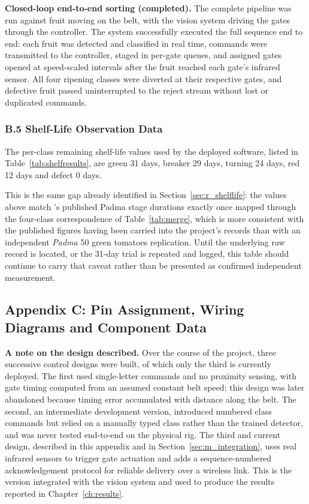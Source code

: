 \textbf{Closed-loop end-to-end sorting (completed).} The complete pipeline was run against fruit moving on the belt, with the vision system driving the gates through the controller. The system successfully executed the full sequence end to end: each fruit was detected and classified in real time, commands were transmitted to the controller, staged in per-gate queues, and assigned gates opened at speed-scaled intervals after the fruit reached each gate's infrared sensor. All four ripening classes were diverted at their respective gates, and defective fruit passed uninterrupted to the reject stream without lost or duplicated commands.

\subsubsection*{B.5 Shelf-Life Observation Data}

The per-class remaining shelf-life values used by the deployed software, listed in Table~\ref{tab:shelfresults}, are green 31 days, breaker 29 days, turning 24 days, red 12 days and defect 0 days.

This is the same gap already identified in Section~\ref{sec:r_shelflife}: the values above match \citet{abekoon2024}'s published Padma stage durations exactly once mapped through the four-class correspondence of Table~\ref{tab:merge}, which is more consistent with the published figures having been carried into the project's records than with an independent \textit{Padma} 50 green tomatoes replication. Until the underlying raw record is located, or the 31-day trial is repeated and logged, this table should continue to carry that caveat rather than be presented as confirmed independent measurement.

\label{app:C}
\subsection*{Appendix C: Pin Assignment, Wiring Diagrams and Component Data}

\textbf{A note on the design described.} Over the course of the project, three successive control designs were built, of which only the third is currently deployed. The first used single-letter commands and no proximity sensing, with gate timing computed from an assumed constant belt speed; this design was later abandoned because timing error accumulated with distance along the belt. The second, an intermediate development version, introduced numbered class commands but relied on a manually typed class rather than the trained detector, and was never tested end-to-end on the physical rig. The third and current design, described in this appendix and in Section~\ref{sec:m_integration}, uses real infrared sensors to trigger gate actuation and adds a sequence-numbered acknowledgement protocol for reliable delivery over a wireless link. This is the version integrated with the vision system and used to produce the results reported in Chapter~\ref{ch:results}.

